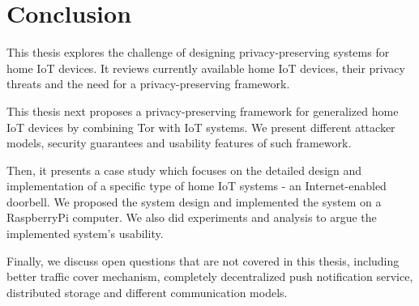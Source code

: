 \chapter{Conclusion}
This thesis explores the challenge of designing privacy-preserving systems for home IoT devices. It reviews currently available home IoT devices, their privacy threats and the need for a privacy-preserving framework.

This thesis next proposes a privacy-preserving framework for generalized home IoT devices by combining Tor with IoT systems. We present different attacker models, security guarantees and usability features of such framework.

Then, it presents a case study which focuses on the detailed design and implementation of a specific type of home IoT systems - an Internet-enabled doorbell. We proposed the system design and implemented the system on a RaspberryPi computer. We also did experiments and analysis to argue the implemented system's usability.

Finally, we discuss  open questions that are not covered in this thesis, including better traffic cover mechanism, completely decentralized push notification service, distributed storage and different communication models.